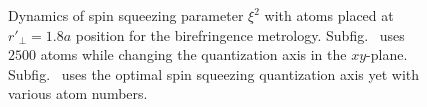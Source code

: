 \documentclass[preprint,aps,pra,onecolumn]{revtex4-1} %
\begin{document}
\begin{figure}
\begin{minipage}{.49\linewidth}
\centering
{}
\end{minipage}
\begin{minipage}{.49\linewidth}
\centering
{}
\end{minipage}
\caption{Dynamics of spin squeezing parameter $ \xi^2 $ with atoms placed at $ r'\!_\perp=1.8a $ position for the birefringence metrology. Subfig.~\protect{} uses $ 2500 $ atoms while changing the quantization axis in the $ xy $-plane. Subfig.~\protect{} uses the optimal spin squeezing quantization axis yet with various atom numbers. }\label{fig:xit_r1d8a}
\end{figure}
\end{document}
